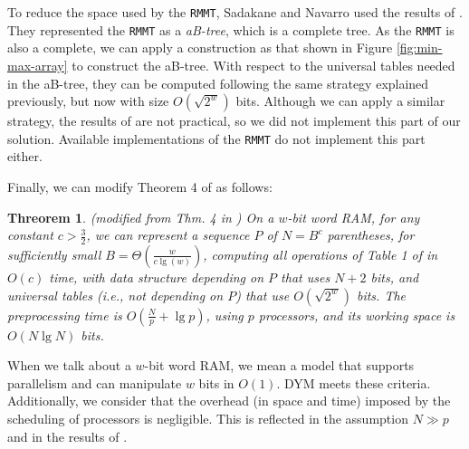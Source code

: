 To reduce the space used by the {\tt RMMT}, Sadakane and Nava\-rro used
the results of \cite{Patrascu:2008:SUC:1470582.1470670}. They
represented the {\tt RMMT} as a \emph{aB-tree}, which is a complete
tree. As the {\tt RMMT} is also a complete, we can apply a
construction as that shown in Figure \ref{fig:min-max-array} to
construct the aB-tree. With respect to the universal tables needed in
the aB-tree, they can be computed following the same strategy
explained previously, but now with size $O(\sqrt{2^{w}})$
bits. Although we can apply a similar strategy, the results of
\cite{Patrascu:2008:SUC:1470582.1470670} are not practical, so we did
not implement this part of our solution. Available implementations of
the {\tt RMMT} do not implement this part either.

Finally, we can modify Theorem 4 of
\cite{Navarro:2014:FFS:2620785.2601073} as follows:
			
\newtheorem{theorem}{Threorem}
\begin{theorem}
  {\sc (modified from Thm. 4 in
    \cite{Navarro:2014:FFS:2620785.2601073})} On a $w$-bit word RAM,
  for any constant $c>\frac{3}{2}$, we can represent a sequence $P$ of
  $N=B^{c}$ parentheses, for sufficiently small
  $B=\Theta(\frac{w}{c\lg(w)})$, computing all operations of Table 1
  of \cite{Navarro:2014:FFS:2620785.2601073} in $O(c)$ time, with data
  structure depending on $P$ that uses $N+2$ bits, and universal
  tables (i.e., not depending on $P$) that use $O(\sqrt{2^{w}})$
  bits. The preprocessing time is $O(\frac{N}{p} + \lg p)$, using $p$
  processors, and its working space is $O(N\lg N)$ bits.
\end{theorem}
				
When we talk about a $w$-bit word RAM, we mean a model that supports
parallelism and can manipulate $w$ bits in $O(1)$. DYM meets these
criteria. Additionally, we consider that the overhead (in space and
time) imposed by the scheduling of processors is negligible. This is
reflected in the assumption $ N\gg p$ and in the results of
\cite{Blumofe:1999:SMC:324133.324234}.

